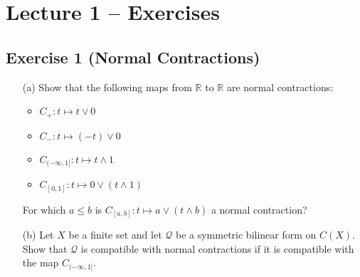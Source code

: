 \section{Lecture 1 -- Exercises}

\subsection{Exercise 1 (Normal Contractions)}
\begin{itemize}
	\item [(a)]
		Show that the following maps from $\mathbb{R}$ to $\mathbb{R}$ are normal contractions:
		\begin{itemize}
			\item 
				$C_{+}:t\mapsto t\vee 0$
			\item 
				$C_{-}:t\mapsto (-t)\vee 0$
			\item 
				$C_{(-\infty,1]}:t\mapsto t\wedge 1$
			\item 
				$C_{[0,1]}:t\mapsto 0\vee(t\wedge 1)$
		\end{itemize}
		For which $a\leq b$ is $C_{[a,b]}:t\mapsto a\vee(t\wedge b)$ a normal contraction?

	\item [(b)]
		Let $X$ be a finite set and let $\mathcal{Q}$ be a symmetric bilinear form on $C(X)$. Show that $\mathcal{Q}$ is compatible with normal contractions if it is compatible with the map $C_{(-\infty,1]}$.
\end{itemize}

